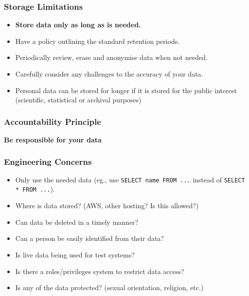 \subsubsection{Storage Limitations}\label{ssub:storage_limitations}

\begin{itemize}
    \item \textbf{Store data only as long as is needed.}
    \item Have a policy outlining the standard retention periods.
    \item Periodically review, erase and anonymise data when not needed.
    \item Carefully consider any challenges to the accuracy of your data.
    \item Personal data can be stored for longer if it is stored for the public interest (scientific, statistical or archival purposes)
\end{itemize}

\subsubsection{Accountability Principle}\label{ssub:accountability_principle}

\textbf{Be responsible for your data}

\subsubsection{Engineering Concerns}\label{ssub:engineering_concerns}
\begin{itemize}
    \item Only use the needed data (eg., use \texttt{SELECT name FROM ...} instead of \texttt{SELECT * FROM ...}).
    \item Where is data stored? (AWS, other hosting? Is this allowed?)
    \item Can data be deleted in a timely manner?
    \item Can a person be easily identified from their data?
    \item Is live data being used for test systems?
    \item Is there a roles/privileges system to restrict data access?
    \item Is any of the data protected? (sexual orientation, religion, etc.)
\end{itemize}

